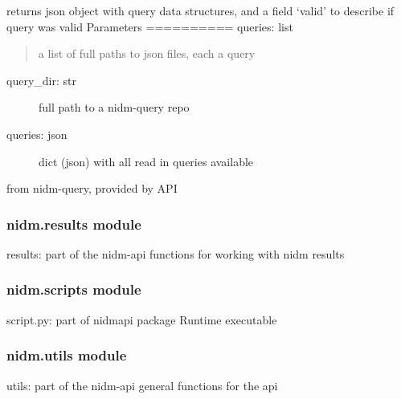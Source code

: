 \documentclass[letterpaper,10pt,english]{sphinxmanual}
\begin{document}

\begin{fulllineitems}
\label{nidm:nidm.query.validate_queries}
returns json object with query data structures, and
a field `valid' to describe if query was valid
Parameters
==========
queries: list
\begin{quote}

a list of full paths to json files, each a query
\end{quote}
\begin{description}
\item[{query\_dir: str}] \leavevmode
full path to a nidm-query repo

\end{description}
\begin{description}
\item[{queries: json}] \leavevmode
dict (json) with all read in queries available

\end{description}

from nidm-query, provided by API

\end{fulllineitems}



\subsubsection{nidm.results module}
\label{nidm:module-nidm.results}\label{nidm:nidm-results-module}
results: part of the nidm-api
functions for working with nidm results


\subsubsection{nidm.scripts module}
\label{nidm:module-nidm.scripts}\label{nidm:nidm-scripts-module}
script.py: part of nidmapi package
Runtime executable

\begin{fulllineitems}
\label{nidm:nidm.scripts.main}
\end{fulllineitems}



\subsubsection{nidm.utils module}
\label{nidm:module-nidm.utils}\label{nidm:nidm-utils-module}
utils: part of the nidm-api
general functions for the api
\end{document}
